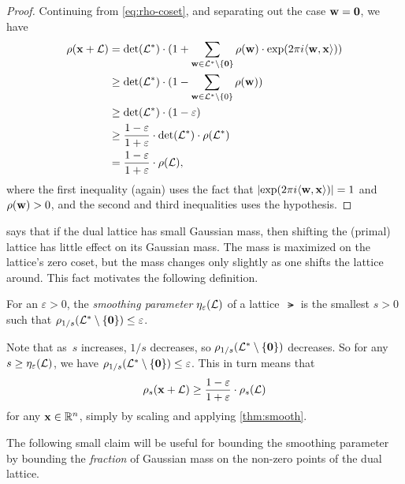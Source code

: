 \documentclass[11pt]{article}
\begin{document}
\begin{proof}
  Continuing from \cref{eq:rho-coset}, and separating out the case
  $\mathbf{w}=\mathbf{0}$, we have
  \begin{align*}
    \rho(\mathbf{x}+\mathcal{L}) 
    &= \det(\mathcal{L}^*) \cdot (1 + \sum_{\mathbf{w} \in \mathcal{L}^*
      \setminus \{\mathbf{0}\}} \rho(\mathbf{w}) \cdot \exp(2\pi i
      \langle\mathbf{w},\mathbf{x}\rangle)) \\
    &\geq \det(\mathcal{L}^{*}) \cdot (1 - \sum_{\mathbf{w} \in \mathcal{L}^{*} \setminus
      \{0\}} \rho(\mathbf{w})) \\
    &\geq \det(\mathcal{L}^{*}) \cdot (1-\varepsilon) \\
    &\geq \frac{1-\varepsilon}{1+\varepsilon} \cdot \det(\mathcal{L}^{*}) \cdot
      \rho(\mathcal{L}^{*}) \\
    &= \frac{1-\varepsilon}{1+\varepsilon} \cdot \rho(\mathcal{L}),
  \end{align*} 
  where the first inequality (again) uses the fact that
  $\lvert\exp(2 \pi i \langle\mathbf{w},\mathbf{x}\rangle)\rvert = 1$ and $\rho(\mathbf{w}) > 0$,
  and the second and third inequalities uses the hypothesis.
\end{proof}

 says that if the dual lattice has small Gaussian
mass, then shifting the (primal) lattice has little effect on its
Gaussian mass. The mass is maximized on the lattice's zero coset, but
the mass changes only slightly as one shifts the lattice around. This
fact motivates the following definition.

\begin{definition}
  For an $\varepsilon > 0$, the \emph{smoothing parameter}
  $\eta_{\varepsilon}(\mathcal{L})$ of a lattice~$\lat$ is the smallest
  $s > 0$ such that
  $\rho_{1/s}(\mathcal{L}^* \setminus \{\mathbf{0}\}) \leq \varepsilon$.
\end{definition}

Note that as~$s$ increases, $1/s$ decreases, so
$\rho_{1/s}(\mathcal{L}^* \setminus \{\mathbf{0}\})$ decreases. So for any
$s \geq \eta_{\varepsilon}(\mathcal{L})$, we have
$\rho_{1/s}(\mathcal{L}^{*} \setminus \{\mathbf{0}\}) \leq \varepsilon$. This
in turn means that
\[ \rho_{s}(\mathbf{x} + \mathcal{L}) \geq \frac{1-\varepsilon}{1+\varepsilon}
  \cdot \rho_{s}(\mathcal{L}) \] for any $\mathbf{x} \in \mathbb{R}^{n}$, simply by
scaling and applying \cref{thm:smooth}.

The following small claim will be useful for bounding the smoothing
parameter by bounding the \emph{fraction} of Gaussian mass on the
non-zero points of the dual lattice.
\end{document}
